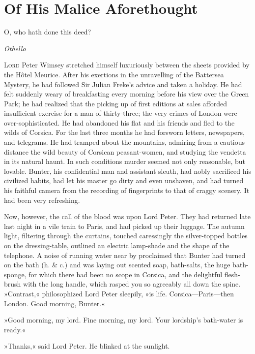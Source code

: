 


\chapter{Of His Malice Aforethought}

\epigraph{O, who hath done this deed?}{\textit{Othello}}


\lettrine[lines=4]{L}{ord} Peter Wimsey stretched himself luxuriously be\-tween the sheets provided by the Hôtel Meurice. After his exertions in the unravelling of the Battersea Mystery, he had followed Sir Julian Freke's advice and taken a holiday. He had felt suddenly weary of breakfasting every morning before his view over the Green Park; he had realized that the picking up of first editions at sales afforded insufficient exercise for a man of thirty-three; the very crimes of London were over-sophisticated. He had abandoned his flat and his friends and fled to the wilds of Corsica. For the last three months he had forsworn letters, newspapers, and telegrams. He had tramped about the mountains, admiring from a cautious distance the wild beauty of Corsican peasant-women, and studying the vendetta in its natural haunt. In such conditions murder seemed not only reasonable, but lovable. Bunter, his confidential man and assistant sleuth, had nobly sacrificed his civilized habits, had let his master go dirty and even unshaven, and had turned his faithful camera from the recording of fingerprints to that of craggy scenery. It had been very refreshing.

Now, however, the call of the blood was upon Lord Peter. They had returned late last night in a vile train to Paris, and had picked up their luggage. The autumn light, filtering through the curtains, touched caressingly the silver-topped bottles on the dressing-table, outlined an electric lamp-shade and the shape of the telephone. A noise of running water near by proclaimed that Bunter had turned on the bath (h. \& c.) and was laying out scented soap, bath-salts, the huge bath-sponge, for which there had been no scope in Corsica, and the delightful flesh-brush with the long handle, which rasped you so agreeably all down the spine. »Contrast,« philosophized Lord Peter sleepily, »is life. Corsica—Paris—then London\textellipsis . Good morning, Bunter.«

»Good morning, my lord. Fine morning, my lord. Your lordship's bath-water is ready.«

»Thanks,« said Lord Peter. He blinked at the sunlight.

